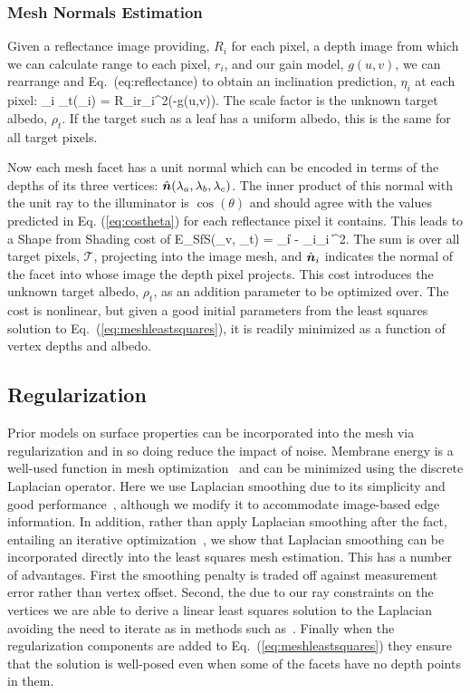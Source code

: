 \subsubsection{Mesh Normals Estimation}

Given a reflectance image providing, $R_i$ for each pixel, a depth image from which we can calculate range to each pixel, $r_i$, and our gain model, $g(u,v)$, we can rearrange and Eq.~({eq:reflectance}) to obtain an inclination prediction, $\eta_i$ at each pixel:
\beq
\eta_i \equiv \rho_t\cos(\theta_i) = R_ir_i^2\exp(-g(u,v)). \label{eq:costheta}
\eeq
The scale factor is the unknown target albedo, $\rho_t$.  If the target such as a leaf has a uniform albedo, this is the same for all target pixels.  

Now each mesh facet has a unit normal which can be encoded in terms of the depths of its three vertices: $\hat{\boldsymbol{n}}(\lambda_a,\lambda_b,\lambda_c)$.  The inner product of this normal with the unit ray to the illuminator is $\cos(\theta)$ and should agree with the values predicted in Eq. (\ref{eq:costheta}) for each reflectance pixel it contains.  This leads to a Shape from Shading cost of
\beq
E_{SfS}(\vlambda_v, \rho_t) = \sum_{i\in {}}\|  - \normal_i\cdot\ray_i \|^2.
\label{eq:esfs}
\eeq
The sum is over all target pixels, $\mathcal{T}$, projecting into the image mesh, and $\hat{\boldsymbol{n}}_i$ indicates the normal of the facet into whose image the depth pixel projects.  This cost introduces the unknown target albedo, $\rho_t$, as an addition parameter to be optimized over.  The cost is nonlinear, but given a good initial parameters from the least squares solution to Eq.~(\ref{eq:meshleastsquares}), it is readily minimized as a function of vertex depths and albedo.

\subsection{Regularization}

Prior models on surface properties can be incorporated into the mesh via regularization and in so doing reduce the impact of noise.  Membrane energy is a well-used function in mesh optimization~\cite{Kobbelt:1998} and can be minimized using the discrete Laplacian operator.  Here we use Laplacian smoothing due to its simplicity and good performance~\cite{Kobbelt:1998,Ohtake2001789,Chen2005376}, although we modify it to accommodate image-based edge information.  In addition, rather than apply Laplacian smoothing after the fact, entailing an iterative optimization~\cite{Kobbelt:1998}, we show that Laplacian smoothing can be incorporated directly into the least squares mesh estimation.  This has a number of  advantages.  First the smoothing penalty is traded off against measurement error rather than vertex offset.  Second, the due to our ray constraints on the vertices we are able to derive a linear least squares solution to the Laplacian avoiding the need to iterate as in methods such as~\cite{Kobbelt:1998}.  Finally  when the regularization components are added to Eq.~(\ref{eq:meshleastsquares}) they ensure that the solution is well-posed even when some of the facets have no depth points in them.

